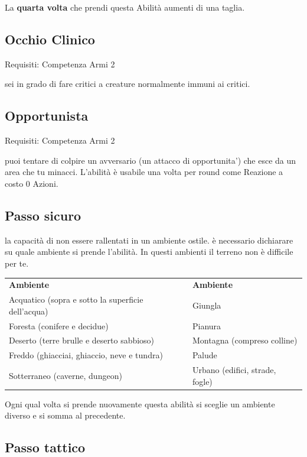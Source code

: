 \documentclass[a4paper,11pt,twoside,openany]{book}
\begin{document}
La \textbf{quarta volta} che prendi questa Abilità aumenti di una taglia.

\subsection{Occhio Clinico}

Requisiti: Competenza Armi 2

sei in grado di fare critici a creature normalmente immuni ai critici.

\subsection{Opportunista}

Requisiti: Competenza Armi 2

puoi tentare di colpire un avversario (un attacco di opportunita') che esce da un area che tu minacci. L'abilità è usabile una volta per round come Reazione a costo 0 Azioni.

\subsection{Passo sicuro}

la capacità di non essere rallentati in un ambiente ostile. è necessario dichiarare su quale ambiente si prende l'abilità. In questi ambienti il terreno non è difficile per te.

\bigskip

\begin{tabular}{ll}
\toprule
\textbf{Ambiente} & \textbf{Ambiente}\tabularnewline
Acquatico (sopra e sotto la superficie dell'acqua) & Giungla\tabularnewline
Foresta (conifere e decidue) & Pianura\tabularnewline
Deserto (terre brulle e deserto sabbioso) & Montagna (compreso colline)\tabularnewline
Freddo (ghiacciai, ghiaccio, neve e tundra) & Palude\tabularnewline
Sotterraneo (caverne, dungeon) & Urbano (edifici, strade, fogle)\tabularnewline

\end{tabular}

\bigskip

Ogni qual volta si prende nuovamente questa abilità si sceglie un
ambiente diverso e si somma al precedente.

\subsection{Passo tattico}
\end{document}
